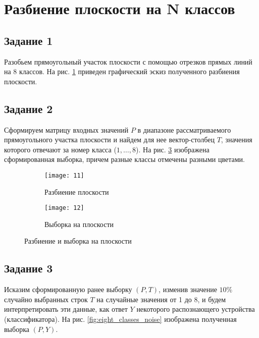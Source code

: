 \newpage

\section{Разбиение плоскости на N классов}

\subsection{Задание 1}

Разобьем прямоугольный участок плоскости с помощью отрезков прямых линий на 8 классов. На рис. \ref{fig:eight_classes_plane_splitting} приведен графический эскиз полученного разбиения плоскости.

\subsection{Задание 2}

Сформируем матрицу входных значений $P$ в диапазоне рассматриваемого прямоугольного участка плоскости и найдем для нее вектор-столбец $T$, значения которого отвечают за номер класса ($1,\dotsc ,8$). На рис. \ref{fig:eight_classes_sample} изображена сформированная выборка, причем разные классы отмечены разными цветами.

\begin{figure}[H]
\begin{center}
	\begin{subfigure}[b]{0.49\textwidth}
		\texttt{[image: 11]}
		\caption{Разбиение плоскости}
		\label{fig:eight_classes_plane_splitting}
	\end{subfigure}
	\begin{subfigure}[b]{0.49\textwidth}
		\texttt{[image: 12]}
		\caption{Выборка на плоскости}
		\label{fig:eight_classes_sample}
	\end{subfigure}
	\caption{Разбиение и выборка на плоскости}
\end{center}
\end{figure}
\vspace{-1.5cm}

\subsection{Задание 3}

Исказим сформированную ранее выборку $(P, T)$, изменив значение $10\%$ случайно выбранных строк $T$ на случайные значения от 1 до 8, и будем интерпретировать эти данные, как ответ $Y$ некоторого распознающего устройства (классификатора). На рис. \ref{fig:eight_classes_noise} изображена полученная выборка $(P, Y)$.

